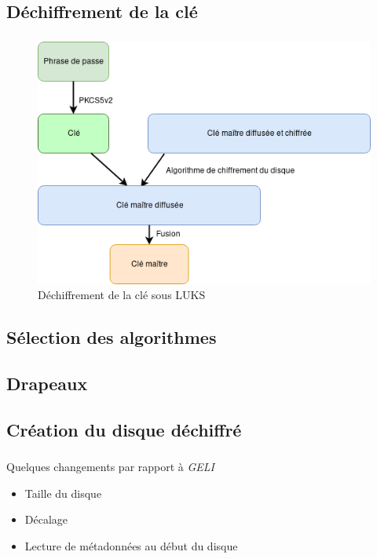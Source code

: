 \subsection{Déchiffrement de la clé}

\begin{frame}
	\frametitle{\insertsubsectionhead}
	\begin{figure}
		\includegraphics[width=.7\textwidth]{developpement/dechiffrement_cle}
		\caption{Déchiffrement de la clé sous LUKS}
	\end{figure}
\end{frame}

\subsection{Sélection des algorithmes}

\subsection{Drapeaux}

\subsection{Création du disque déchiffré}

\begin{frame}
	\frametitle{\insertsubsectionhead}
	\begin{block}{Quelques changements par rapport à \textit{GELI}}
		\begin{itemize}
			\item Taille du disque
				\pause
			\item Décalage
				\pause
			\item Lecture de métadonnées au début du disque
		\end{itemize}
	\end{block}
\end{frame}

